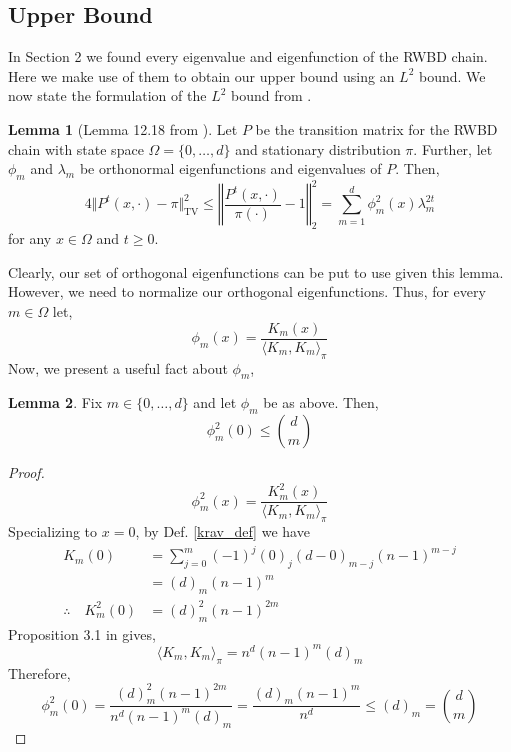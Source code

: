 \documentclass{article}
\theoremstyle{definition}
\theoremstyle{definition}
\theoremstyle{definition}
\newtheorem{lemma}{Lemma}
\theoremstyle{definition}
\theoremstyle{named}
\begin{document}
\subsection{Upper Bound}
In Section 2 we found every eigenvalue and eigenfunction of the RWBD chain. Here we make use of them to obtain our upper bound using an $L^2$ bound. We now state the formulation of the $L^2$ bound from \cite{levin_markov_2017}.
\begin{lemma}[Lemma 12.18 from \cite{levin_markov_2017}]
   \label{l2}
   Let $P$ be the transition matrix for the RWBD chain with state space $\Omega = \{0,\dots,d\}$ and stationary distribution $\pi$. Further, let $\phi_m$ and $\lambda_m$ be orthonormal eigenfunctions and eigenvalues of $P$. Then,
   \[4\Vert P^t(x,\cdot) - \pi \Vert_\text{TV}^2 \leq \left\Vert\frac{P^t(x,\cdot)}{\pi(\cdot)}-1\right\Vert_2^2 = \sum_{m=1}^d \phi_m^2(x) \lambda_m^{2t}\]
   for any $x\in \Omega$ and $t\geq 0$.
\end{lemma}
\noindent Clearly, our set of orthogonal eigenfunctions can be put to use given this lemma. However, we need to normalize our orthogonal eigenfunctions. Thus, for every $m\in \Omega$ let,
\[\phi_m(x) = \frac{K_m(x)}{\langle K_m, K_m \rangle_\pi}\]
Now, we present a useful fact about $\phi_m$,
\begin{lemma}
   \label{choose}
   Fix $m\in \{0,\dots,d\}$ and let $\phi_m$ be as above. Then,
   \[\phi_m^2(0) \leq {d \choose m}\]
   \begin{proof}
     
     \[\phi_m^2(x) = \frac{K_m^2(x)}{\langle K_m, K_m\rangle_\pi}\]
     Specializing to $x=0$, by Def. \ref{krav_def} we have
   \begin{align*}
   K_m(0) &= \sum_{j=0}^m (-1)^j(0)_j(d-0)_{m-j}(n-1)^{m-j}\\
   &= (d)_{m}(n-1)^{m} \tag{$\because (0)_j = 0, \quad\forall j>0$}\\
   \therefore \quad K_m^2(0) &= (d)^2_{m}(n-1)^{2m}
   \end{align*}
     Proposition 3.1 in \cite{coleman_krawtchouk_2011} gives,
     \[\langle K_m, K_m\rangle_\pi = n^d(n-1)^m(d)_m\]
   Therefore,
   \[\phi^2_m(0) = \frac{(d)_m^2(n-1)^{2m}}{n^d(n-1)^m(d)_m} = \frac{(d)_m(n-1)^{m}}{n^d} \leq (d)_m = {d \choose m}\]

   \end{proof}

\end{lemma}
\end{document}
